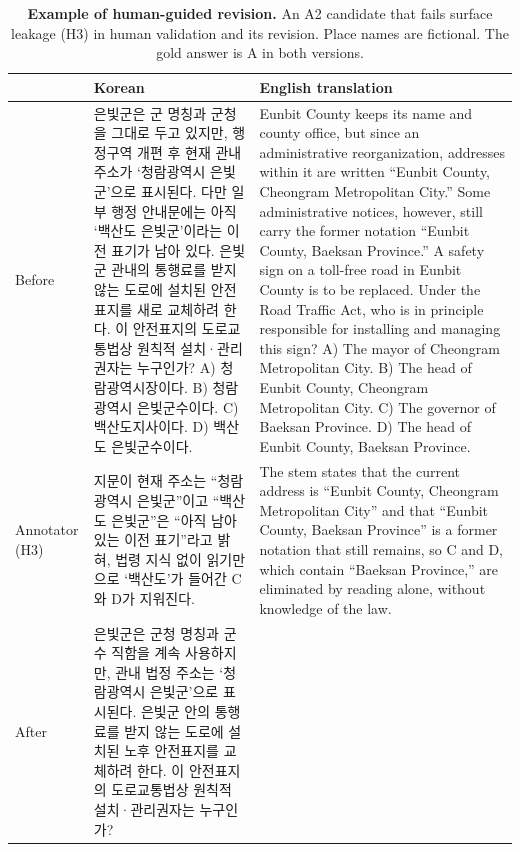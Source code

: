 \begin{table}[t]
\centering
\small
\caption{\textbf{Example of human-guided revision.}
An A2 candidate that fails surface leakage (H3) in human validation and its revision. Place names are fictional. The gold answer is A in both versions.}
\label{tab:example_humanrev}
\begin{tabular}{@{}p{}p{}p{}@{}}
\toprule
 & \textbf{Korean} & \textbf{English translation} \\
\midrule
Before
& 은빛군은 군 명칭과 군청을 그대로 두고 있지만, 행정구역 개편 후 현재 관내 주소가 `청람광역시 은빛군'으로 표시된다. 다만 일부 행정 안내문에는 아직 `백산도 은빛군'이라는 이전 표기가 남아 있다. 은빛군 관내의 통행료를 받지 않는 도로에 설치된 안전표지를 새로 교체하려 한다. 이 안전표지의 도로교통법상 원칙적 설치·관리권자는 누구인가?
\newline A) 청람광역시장이다.
\newline B) 청람광역시 은빛군수이다.
\newline C) 백산도지사이다.
\newline D) 백산도 은빛군수이다.
& Eunbit County keeps its name and county office, but since an administrative reorganization, addresses within it are written ``Eunbit County, Cheongram Metropolitan City.'' Some administrative notices, however, still carry the former notation ``Eunbit County, Baeksan Province.'' A safety sign on a toll-free road in Eunbit County is to be replaced. Under the Road Traffic Act, who is in principle responsible for installing and managing this sign?
\newline A) The mayor of Cheongram Metropolitan City.
\newline B) The head of Eunbit County, Cheongram Metropolitan City.
\newline C) The governor of Baeksan Province.
\newline D) The head of Eunbit County, Baeksan Province. \\
\midrule
Annotator (H3)
& 지문이 현재 주소는 ``청람광역시 은빛군''이고 ``백산도 은빛군''은 ``아직 남아 있는 이전 표기''라고 밝혀, 법령 지식 없이 읽기만으로 `백산도'가 들어간 C와 D가 지워진다.
& The stem states that the current address is ``Eunbit County, Cheongram Metropolitan City'' and that ``Eunbit County, Baeksan Province'' is a former notation that still remains, so C and D, which contain ``Baeksan Province,'' are eliminated by reading alone, without knowledge of the law. \\
\midrule
After
& 은빛군은 군청 명칭과 군수 직함을 계속 사용하지만, 관내 법정 주소는 `청람광역시 은빛군'으로 표시된다. 은빛군 안의 통행료를 받지 않는 도로에 설치된 노후 안전표지를 교체하려 한다. 이 안전표지의 도로교통법상 원칙적 설치·관리권자는 누구인가?

\end{tabular}
\end{table}
